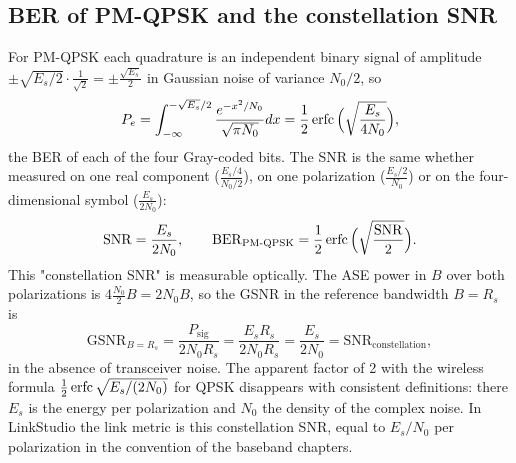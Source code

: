 \subsection{BER of PM-QPSK and the constellation SNR}\label{sec:coherent-snr}
For PM-QPSK each quadrature is an independent binary signal of amplitude $\pm\sqrt{E_s/2}\cdot\frac1{\sqrt2}=\pm\frac{\sqrt{E_s}}2$
in Gaussian noise of variance $N_0/2$, so
\begin{equation}
  P_e=\int_{-\infty}^{-\sqrt{E_s}/2}\frac{e^{-x^2/N_0}}{\sqrt{\pi N_0}}dx=\frac12\operatorname{erfc}\Big(\sqrt{\frac{E_s}{4N_0}}\Big),
\end{equation}
the BER of each of the four Gray-coded bits. The SNR is the same whether measured on one real
component ($\frac{E_s/4}{N_0/2}$), on one polarization ($\frac{E_s/2}{N_0}$) or on the four-dimensional symbol
($\frac{E_s}{2N_0}$):
\begin{equation}
  \mathrm{SNR}=\frac{E_s}{2N_0},\qquad \mathrm{BER}_{\mathrm{PM\text-QPSK}}=\frac12\operatorname{erfc}\Big(\sqrt{\frac{\mathrm{SNR}}2}\Big).
\end{equation}
This "constellation SNR" is measurable optically. The ASE power in $B$ over both polarizations is
$4\frac{N_0}2B=2N_0B$, so the GSNR in the reference bandwidth $B=R_s$ is
\begin{equation}
  \mathrm{GSNR}_{B=R_s}=\frac{P_{\mathrm{sig}}}{2N_0R_s}=\frac{E_sR_s}{2N_0R_s}=\frac{E_s}{2N_0}=\mathrm{SNR}_{\mathrm{constellation}},
\end{equation}
in the absence of transceiver noise. The apparent factor of 2 with the wireless formula
$\frac12\operatorname{erfc}\sqrt{E_s/(2N_0)}$ for QPSK disappears with consistent definitions: there $E_s$ is the
energy per polarization and $N_0$ the density of the complex noise. In LinkStudio the link metric
 is this constellation SNR, equal to $E_s/N_0$ per polarization in the convention of
the baseband chapters.

